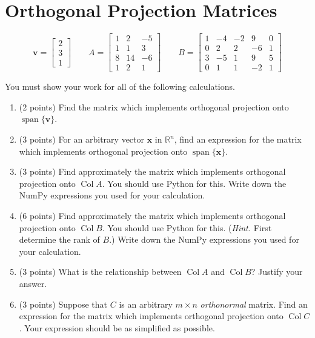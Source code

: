 \documentclass{article}
\theoremstyle{remark}
\newcommand{\vv}[1]{\mathbf{#1}}
\newcommand{\R}{\mathbb R}
\DeclareMathOperator{\vspan}{span}
\DeclareMathOperator{\col}{Col}
\begin{document}
\pagebreak
\section{Orthogonal Projection Matrices}

\begin{displaymath}
  \vv v =
  \begin{bmatrix}
    2 \\ 3 \\ 1
  \end{bmatrix}
  \qquad
  A =
  \begin{bmatrix}
    1 & 2 & -5 \\
    1 & 1 & 3 \\
    8 & 14 & -6 \\
    1 & 2 & 1
  \end{bmatrix}
  \qquad
  B =
  \begin{bmatrix}
    1 & -4 & -2 & 9 & 0 \\
    0 & 2 & 2 & -6 & 1 \\
    3 & -5 & 1 & 9 & 5 \\
    0 & 1 & 1 & -2 & 1
  \end{bmatrix}
\end{displaymath}

You must show your work for all of the following calculations.
\begin{enumerate}
\item (2 points) Find the matrix which implements orthogonal projection onto $\vspan\{\vv v\}$.
\item (3 points) For an arbitrary vector $\vv x$ in $\R^n$, find an expression for the matrix which implements orthogonal projection onto $\vspan\{\vv x\}$.
\item (3 points) Find approximately the matrix which implements orthogonal projection onto $\col A$.
  You should use Python for this.
  Write down the NumPy expressions you used for your calculation.
\item (6 points) Find approximately the matrix which implements orthogonal projection onto $\col B$.
  You should use Python for this. (\textit{Hint.} First determine the rank of $B$.)
  Write down the NumPy expressions you used for your calculation.
\item (3 points) What is the relationship between $\col A$ and $\col B$? Justify your answer.
\item (3 points) Suppose that $C$ is an arbitrary $m \times n$ \textit{orthonormal} matrix. Find an expression for the matrix which implements orthogonal projection onto $\col C$. Your expression should be as simplified as possible.
\end{enumerate}
\end{document}
